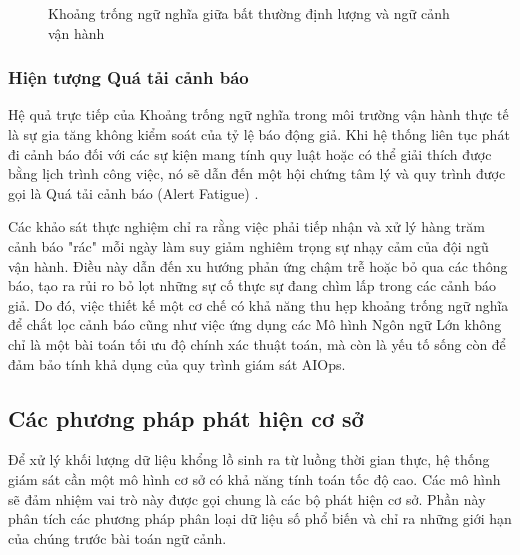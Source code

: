 \begin{figure}[htbp]
{
    }
    \vspace{0.5cm}
    \caption{Khoảng trống ngữ nghĩa giữa bất thường định lượng và ngữ cảnh vận hành}
    \label{fig:semantic-gap}
\end{figure}
\subsubsection{Hiện tượng Quá tải cảnh báo}
Hệ quả trực tiếp của Khoảng trống ngữ nghĩa trong môi trường vận hành thực tế là sự gia tăng không kiểm soát của tỷ lệ báo động giả. Khi hệ thống liên tục phát đi cảnh báo đối với các sự kiện mang tính quy luật hoặc có thể giải thích được bằng lịch trình công việc, nó sẽ dẫn đến một hội chứng tâm lý và quy trình được gọi là Quá tải cảnh báo (Alert Fatigue) .

Các khảo sát thực nghiệm chỉ ra rằng việc phải tiếp nhận và xử lý hàng trăm cảnh báo "rác" mỗi ngày làm suy giảm nghiêm trọng sự nhạy cảm của đội ngũ vận hành. Điều này dẫn đến xu hướng phản ứng chậm trễ hoặc bỏ qua các thông báo, tạo ra rủi ro bỏ lọt những sự cố thực sự đang chìm lấp trong các cảnh báo giả. Do đó, việc thiết kế một cơ chế có khả năng thu hẹp khoảng trống ngữ nghĩa để chắt lọc cảnh báo cũng như việc ứng dụng các Mô hình Ngôn ngữ Lớn không chỉ là một bài toán tối ưu độ chính xác thuật toán, mà còn là yếu tố sống còn để đảm bảo tính khả dụng của quy trình giám sát AIOps.

\subsection{Các phương pháp phát hiện cơ sở}
Để xử lý khối lượng dữ liệu khổng lồ sinh ra từ luồng thời gian thực, hệ thống giám sát cần một mô hình cơ sở có khả năng tính toán tốc độ cao. Các mô hình sẽ đảm nhiệm vai trò này được gọi chung là các bộ phát hiện cơ sở. Phần này phân tích các phương pháp phân loại dữ liệu số phổ biến và chỉ ra những giới hạn của chúng trước bài toán ngữ cảnh.
